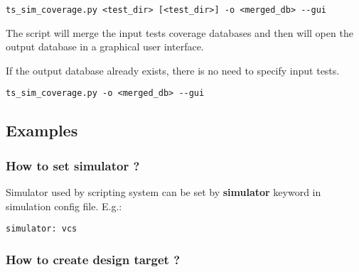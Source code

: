 \documentclass{tropic_design_spec}
\begin{document}
\begin{lstlisting}
ts_sim_coverage.py <test_dir> [<test_dir>] -o <merged_db> --gui
\end{lstlisting}

The script will merge the input tests coverage databases and then will open
the output database in a graphical user interface.


If the output database already exists, there is no need to specify input tests.

\begin{lstlisting}
ts_sim_coverage.py -o <merged_db> --gui
\end{lstlisting}



\subsection{Examples}


\subsubsection{How to set simulator ?}
\label{sec:how-to-set-simulator}

Simulator used by scripting system can be set by \textbf{simulator} keyword in
simulation config file. E.g.:

\begin{lstlisting}
simulator: vcs
\end{lstlisting}




\subsubsection{How to create design target ?}
\label{sec:how-to-create-design-target}
\end{document}
